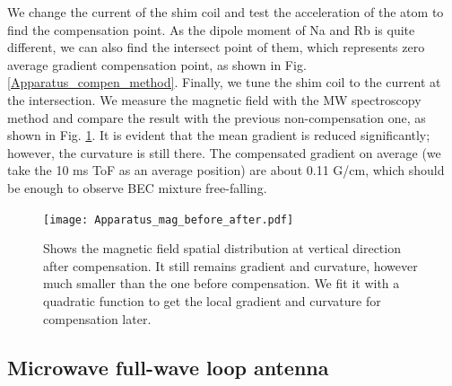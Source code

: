 We change the current of the shim coil and test the acceleration of the atom to find the compensation point. As the dipole moment of Na and Rb is quite different, we can also find the intersect point of them, which represents zero average gradient compensation point, as shown in Fig. \ref{Apparatus_compen_method}. Finally, we tune the shim coil to the current at the intersection. We measure the magnetic field with the MW spectroscopy method and compare the result with the previous non-compensation one, as shown in Fig. \ref{Apparatus_mag_before_after}. It is evident that the mean gradient is reduced significantly; however, the curvature is still there. The compensated gradient on average (we take the 10 ms ToF as an average position) are about 0.11 G/cm, which should be enough to observe BEC mixture free-falling.

\begin{figure}[htb]
\begin{center}
\texttt{[image: Apparatus\_mag\_before\_after.pdf]}
\end{center}
\caption[Magnetic field spatial distribution at vertical direction after compensation]{Shows the magnetic field spatial distribution at vertical direction after compensation. It still remains gradient and curvature, however much smaller than the one before compensation. We fit it with a quadratic function to get the local gradient and curvature for compensation later.}
\label{Apparatus_mag_before_after}
\end{figure}

\subsection{Microwave full-wave loop antenna}
\label{subsec:FWLA}

